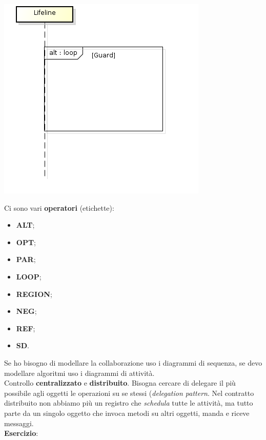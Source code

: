 \begin{center}

\includegraphics[width=0.75\columnwidth]{img8} %

\end{center}

Ci sono vari \textbf{operatori} (etichette):

\begin{itemize}

	\item \textbf{ALT};
	\item \textbf{OPT};
	\item \textbf{PAR};
	\item \textbf{LOOP};
	\item \textbf{REGION};
	\item \textbf{NEG};
	\item \textbf{REF};
	\item \textbf{SD}.

\end{itemize}

Se ho bisogno di modellare la collaborazione uso i diagrammi di sequenza, se devo modellare algoritmi uso i diagrammi di attività.\\
Controllo \textbf{centralizzato} e \textbf{distribuito}. Bisogna cercare di delegare il più possibile agli oggetti le operazioni su se stessi (\textit{delegation pattern}. Nel contratto distribuito non abbiamo più un registro che \textit{schedula} tutte le attività, ma tutto parte da un singolo oggetto che invoca metodi su altri oggetti, manda e riceve messaggi.\\
\textbf{Esercizio}:


